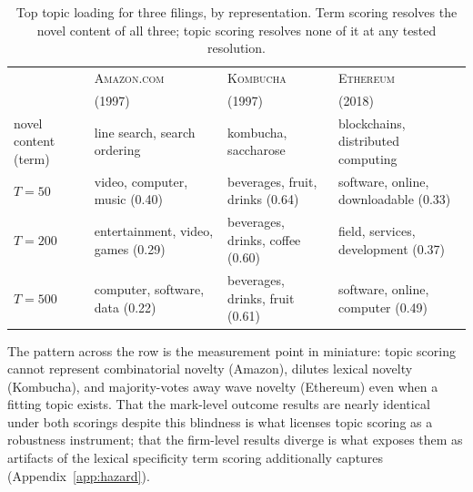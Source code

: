 \begin{table}[h]\centering\small
\caption{Top topic loading for three filings, by representation. Term
scoring resolves the novel content of all three; topic scoring resolves
none of it at any tested resolution.}
\label{tab:exhibit}
\begin{tabular}{lp{3.1cm}p{3.1cm}p{3.1cm}}
\toprule
& \textsc{Amazon.com} & \textsc{Kombucha} & \textsc{Ethereum} \\
& (1997) & (1997) & (2018) \\
\midrule
novel content (term) & line search, search ordering & kombucha, saccharose & blockchains, distributed computing \\
$T=50$ & video, computer, music (0.40) & beverages, fruit, drinks (0.64) & software, online, downloadable (0.33) \\
$T=200$ & entertainment, video, games (0.29) & beverages, drinks, coffee (0.60) & field, services, development (0.37) \\
$T=500$ & computer, software, data (0.22) & beverages, drinks, fruit (0.61) & software, online, computer (0.49) \\
\bottomrule
\end{tabular}
\end{table}

The pattern across the row is the measurement point in miniature: topic
scoring cannot represent combinatorial novelty (Amazon), dilutes lexical
novelty (Kombucha), and majority-votes away wave novelty (Ethereum) even
when a fitting topic exists. That the mark-level outcome results are
nearly identical under both scorings despite this blindness is what
licenses topic scoring as a robustness instrument; that the firm-level
results diverge is what exposes them as artifacts of the lexical
specificity term scoring additionally captures
(Appendix~\ref{app:hazard}).

